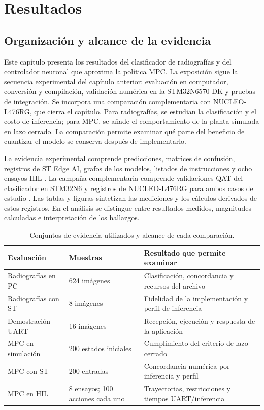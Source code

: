 \chapter{Resultados}\label{cap:resultados}
\FloatBarrier
\section{Organización y alcance de la evidencia}
Este capítulo presenta los resultados del clasificador de radiografías y del controlador neuronal que aproxima la política MPC. La exposición sigue la secuencia experimental del capítulo anterior: evaluación en computador, conversión y compilación, validación numérica en la STM32N6570-DK y pruebas de integración. Se incorpora una comparación complementaria con NUCLEO-L476RG, que cierra el capítulo. Para radiografías, se estudian la clasificación y el costo de inferencia; para MPC, se añade el comportamiento de la planta simulada en lazo cerrado. La comparación permite examinar qué parte del beneficio de cuantizar el modelo se conserva después de implementarlo.

La evidencia experimental comprende predicciones, matrices de confusión, registros de ST Edge AI, grafos de los modelos, listados de instrucciones y ocho ensayos HIL \cite{res_archivo2026}. La campaña complementaria comprende validaciones QAT del clasificador en STM32N6 y registros de NUCLEO-L476RG para ambos casos de estudio \cite{res_ampliacion2026}. Las tablas y figuras sintetizan las mediciones y los cálculos derivados de estos registros. En el análisis se distingue entre resultados medidos, magnitudes calculadas e interpretación de los hallazgos.

\begin{table}[htbp]\centering\small
\caption{Conjuntos de evidencia utilizados y alcance de cada comparación.}\label{tab:res_alcance}
\begin{tabularx}{\linewidth}{p{3.5cm}p{2.6cm}Y}\toprule
Evaluación & Muestras & Resultado que permite examinar\\\midrule
Radiografías en PC & 624 imágenes & Clasificación, concordancia y recursos del archivo\\
Radiografías con ST & 8 imágenes & Fidelidad de la implementación y perfil de inferencia\\
Demostración UART & 16 imágenes & Recepción, ejecución y respuesta de la aplicación\\
MPC en simulación & 200 estados iniciales & Cumplimiento del criterio de lazo cerrado\\
MPC con ST & 200 entradas & Concordancia numérica por inferencia y perfil\\
MPC en HIL & 8 ensayos; 100 acciones cada uno & Trayectorias, restricciones y tiempos UART/inferencia\\\bottomrule
\end{tabularx}
\end{table}

